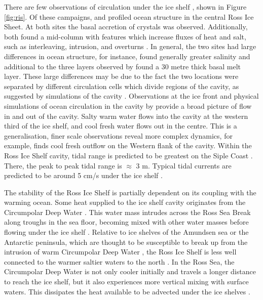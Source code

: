 There are few observations of circulation under the ice shelf \citep[e.g.][]{jacobs1979circulation,stewart2018ice,stevens2020ocean,robinson2020ice}, shown in Figure \ref{fig:ris}.
Of these campaigns, \cite{jacobs1979circulation} and \cite{stewart2018ice}  profiled ocean structure in the central Ross Ice Sheet. At both sites the basal accretion of crystals was observed. Additionally, both found a mid-column with features which increase fluxes of heat and salt, such as interleaving, intrusion, and overturns  \cite{stewart2018ice}. In general, the two sites had large differences in ocean structure, for instance, \cite{stewart2018ice} found generally greater salinity and additional to the three layers observed by \cite{jacobs1979circulation} found a 30 metre thick basal melt layer. These large differences may be due to the fact the two locations were separated by different circulation cells which divide regions of the cavity, as suggested by simulations of the cavity \cite{pritchard2012antarctic}.
Observations at the ice front \citep[e.g.][]{smethie2005circulation} and physical simulations of ocean circulation in the cavity by \cite{holland2003ice} provide a broad picture of flow in and out of the cavity. Salty warm water flows into the cavity at the western third of the ice shelf, and cool fresh water flows out in the centre. This is a generalisation, finer scale observations reveal more complex dynamics, for example, \cite{robinson2014evolution} finds cool fresh outflow on the Western flank of the cavity. 
Within the Ross Ice Shelf cavity, tidal range is predicted to be greatest on the Siple Coast \citep{padman2003tides}. There, the peak to peak tidal range is $\approx$ 3 m. Typical tidal currents are predicted to be around 5 cm/s under the ice shelf \citep{padman2003tides}.

The stability of the Ross Ice Shelf is partially dependent on its coupling with the warming ocean. Some heat supplied to the ice shelf cavity originates from the Circumpolar Deep Water \cite[e.g.][]{rignot2002mass}. This water mass intrudes across the Ross Sea Break along troughs in the sea floor, becoming mixed with other water masses before flowing under the ice shelf \citep{castagno2017temporal}. Relative to ice shelves of the Amundsen sea or the Antarctic peninsula, which are thought to be susceptible to break up from the intrusion of warm Circumpolar Deep Water \citep{ favier2014retreat}, the Ross Ice Shelf is less well connected to the warmer saltier waters to the north \citep{dinniman2011model}. In the Ross Sea, the Circumpolar Deep Water is not only cooler initially and travels a longer distance to reach the ice shelf, but it also experiences more vertical mixing with surface waters. This dissipates the heat available to be advected under the ice shelves \citep{dinniman2011model}.

